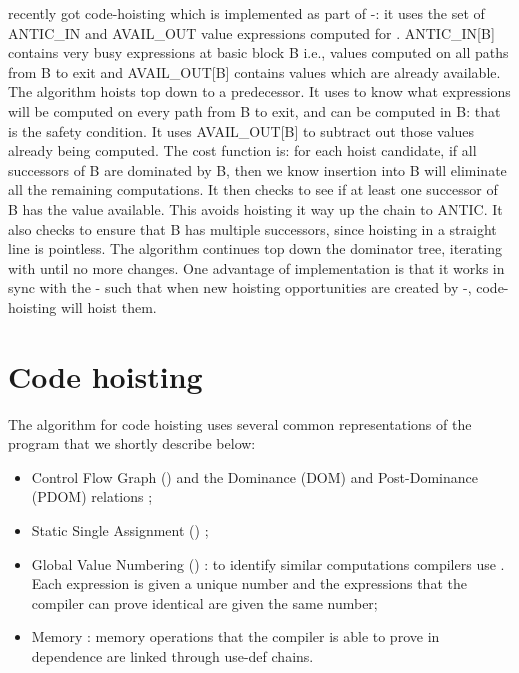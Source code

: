 \documentclass{sig-alternate}
\begin{document}
\GCC{} recently got code-hoisting \cite{GCCCodeHoisting} which is implemented as
part of \GVN{}-\PRE{}: it uses the set of ANTIC\_IN and AVAIL\_OUT value
expressions computed for \PRE{}. ANTIC\_IN[B] contains very busy expressions at
basic block B i.e., values computed on all paths from B to exit and
AVAIL\_OUT[B] contains values which are already available. The algorithm hoists
top down to a predecessor.  It uses to know what expressions will be computed on
every path from B to exit, and can be computed in B: that is the safety
condition.  It uses AVAIL\_OUT[B] to subtract out those values already being
computed.  The cost function is: for each hoist candidate, if all successors of
B are dominated by B, then we know insertion into B will eliminate all the
remaining computations.  It then checks to see if at least one successor of B
has the value available.  This avoids hoisting it way up the chain to ANTIC.  It
also checks to ensure that B has multiple successors, since hoisting in a
straight line is pointless.  The algorithm continues top down the dominator
tree, iterating with \PRE{} until no more changes.  One advantage of \GCC{}
implementation is that it works in sync with the \GVN{}-\PRE{} such that when
new hoisting opportunities are created by \GVN{}-\PRE{}, code-hoisting will
hoist them.

\newpage

\section{Code hoisting}

The algorithm for code hoisting uses several common representations of the
program that we shortly describe below:
\begin{itemize}
\item Control Flow Graph (\CFG{}) and the Dominance (DOM) and Post-Dominance (PDOM)
  relations \cite{dragonbook};
\item Static Single Assignment (\SSA{}) \cite{cytron};
\item Global Value Numbering (\GVN{}) \cite{rosen1988global,click1995global}: to
  identify similar computations compilers use \GVN{}.  Each expression is given a
  unique number and the expressions that the compiler can prove identical are
  given the same number;
\item Memory \SSA{} \cite{novillo2007memory}: memory operations that the compiler
  is able to prove in dependence are linked through use-def chains.
\end{itemize}
\end{document}
